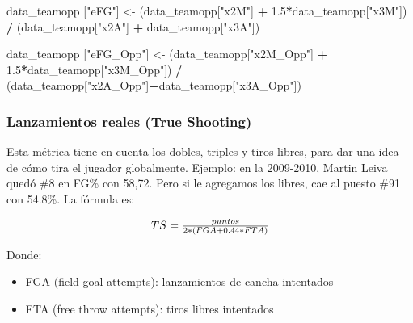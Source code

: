 \documentclass[
]{article}
\newenvironment{Shaded}{\begin{snugshade}}{\end{snugshade}}
\newcommand{\FloatTok}[1]{\textcolor[rgb]{0.00,0.00,0.81}{#1}}
\newcommand{\NormalTok}[1]{#1}
\newcommand{\OperatorTok}[1]{\textcolor[rgb]{0.81,0.36,0.00}{\textbf{#1}}}
\newcommand{\StringTok}[1]{\textcolor[rgb]{0.31,0.60,0.02}{#1}}
\providecommand{\tightlist}{%
  \setlength{\itemsep}{0pt}\setlength{\parskip}{0pt}}
\begin{document}
\begin{Shaded}
\begin{Highlighting}[]
\NormalTok{data_teamopp [}\StringTok{"eFG"}\NormalTok{] <-}\StringTok{ }\NormalTok{(data_teamopp[}\StringTok{"x2M"}\NormalTok{] }\OperatorTok{+}\StringTok{ }\FloatTok{1.5}\OperatorTok{*}\NormalTok{data_teamopp[}\StringTok{"x3M"}\NormalTok{]) }\OperatorTok{/}
\StringTok{  }\NormalTok{(data_teamopp[}\StringTok{"x2A"}\NormalTok{] }\OperatorTok{+}\StringTok{ }\NormalTok{data_teamopp[}\StringTok{"x3A"}\NormalTok{])}

\NormalTok{data_teamopp [}\StringTok{"eFG_Opp"}\NormalTok{] <-}\StringTok{ }\NormalTok{(data_teamopp[}\StringTok{"x2M_Opp"}\NormalTok{] }\OperatorTok{+}\StringTok{ }\FloatTok{1.5}\OperatorTok{*}\NormalTok{data_teamopp[}\StringTok{"x3M_Opp"}\NormalTok{]) }\OperatorTok{/}
\StringTok{  }\NormalTok{(data_teamopp[}\StringTok{"x2A_Opp"}\NormalTok{]}\OperatorTok{+}\NormalTok{data_teamopp[}\StringTok{"x3A_Opp"}\NormalTok{])}
\end{Highlighting}
\end{Shaded}

\hypertarget{lanzamientos-reales-true-shooting}{%
\subsubsection{Lanzamientos reales (True
Shooting)}\label{lanzamientos-reales-true-shooting}}

Esta métrica tiene en cuenta los dobles, triples y tiros libres, para
dar una idea de cómo tira el jugador globalmente. Ejemplo: en la
2009-2010, Martin Leiva quedó \#8 en FG\% con 58,72. Pero si le
agregamos los libres, cae al puesto \#91 con 54.8\%. La fórmula es:

\[
  \makebox[\linewidth]{$TS = \frac{puntos}{2*(FGA+0.44*FTA)}$}
\]

Donde:

\begin{itemize}
\tightlist
\item
  FGA (field goal attempts): lanzamientos de cancha intentados
\item
  FTA (free throw attempts): tiros libres intentados
\end{itemize}
\end{document}
